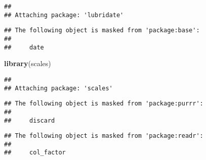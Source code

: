 \documentclass[]{article}
\newenvironment{Shaded}{\begin{snugshade}}{\end{snugshade}}
\newcommand{\CommentTok}[1]{\textcolor[rgb]{0.56,0.35,0.01}{\textit{#1}}}
\newcommand{\DataTypeTok}[1]{\textcolor[rgb]{0.13,0.29,0.53}{#1}}
\newcommand{\DecValTok}[1]{\textcolor[rgb]{0.00,0.00,0.81}{#1}}
\newcommand{\KeywordTok}[1]{\textcolor[rgb]{0.13,0.29,0.53}{\textbf{#1}}}
\newcommand{\NormalTok}[1]{#1}
\newcommand{\OperatorTok}[1]{\textcolor[rgb]{0.81,0.36,0.00}{\textbf{#1}}}
\newcommand{\OtherTok}[1]{\textcolor[rgb]{0.56,0.35,0.01}{#1}}
\newcommand{\StringTok}[1]{\textcolor[rgb]{0.31,0.60,0.02}{#1}}
\begin{document}
\begin{verbatim}
## 
## Attaching package: 'lubridate'
\end{verbatim}

\begin{verbatim}
## The following object is masked from 'package:base':
## 
##     date
\end{verbatim}

\begin{Shaded}
\begin{Highlighting}[]
\KeywordTok{library}\NormalTok{(scales)}
\end{Highlighting}
\end{Shaded}

\begin{verbatim}
## 
## Attaching package: 'scales'
\end{verbatim}

\begin{verbatim}
## The following object is masked from 'package:purrr':
## 
##     discard
\end{verbatim}

\begin{verbatim}
## The following object is masked from 'package:readr':
## 
##     col_factor
\end{verbatim}

\begin{Shaded}
\end{Shaded}
\end{document}
